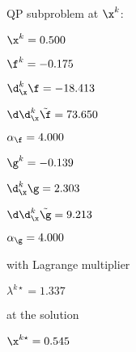 QP subproblem at $\x^{k}$:

\bigskip
$\x^k=   0.500$


$\f^k =  -0.175$

$\d^k_{\x} \f = -18.413$

$\d\d^k_{\x} \tilde \f =  73.650$

$\alpha_{\footnotesize\f} =   4.000$

\bigskip
$\g^k =  -0.139$

$\d^k_{\x}\g =   2.303$

$\d\d^k_{\x} \tilde \g =   9.213$

$\alpha_{\footnotesize\g} =   4.000$

\bigskip
with Lagrange multiplier

$\lambda^{k\star} =   1.337$

at the solution

$\x^{k\star} =   0.545$

